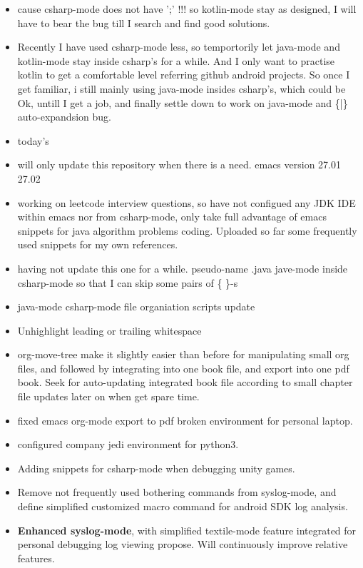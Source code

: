 \documentclass[9pt, b5paper]{article}
\begin{document}
\begin{itemize}
\item cause csharp-mode does not have ';' !!! so kotlin-mode stay as designed, I will have to bear the bug till I search and find good solutions.
\item Recently I have used csharp-mode less, so temportorily let java-mode and kotlin-mode stay inside csharp's for a while. And I only want to practise kotlin to get a comfortable level referring github android projects. So once I get familiar, i still mainly using java-mode insides csharp's, which could be Ok, untill I get a job, and finally settle down to work on java-mode and \{|\} auto-expandsion bug.

\item today's
\item will only update this repository when there is a need. emacs version 27.01 27.02
\item working on leetcode interview questions, so have not configued any JDK IDE within emacs nor from csharp-mode, only take full advantage of emacs snippets for java algorithm problems coding. Uploaded so far some frequently used snippets for my own references.
\item having not update this one for a while. pseudo-name .java jave-mode inside csharp-mode so that I can skip some pairs of \{ \}-s
\item java-mode csharp-mode file organiation scripts update
\item Unhighlight leading or trailing whitespace
\item org-move-tree make it slightly easier than before for manipulating small org files, and followed by integrating into one book file, and export into one pdf book. Seek for auto-updating integrated book file according to small chapter file updates later on when get spare time.
\item fixed emacs org-mode export to pdf broken environment for personal laptop.
\item configured company jedi environment for python3.
\item Adding snippets for csharp-mode when debugging unity games.
\item Remove not frequently used bothering commands from syslog-mode, and define simplified customized macro command for android SDK log analysis.
\item \textbf{Enhanced syslog-mode}, with simplified textile-mode feature integrated for personal debugging log viewing propose. Will continuously improve relative features.

\end{itemize}
\end{document}
